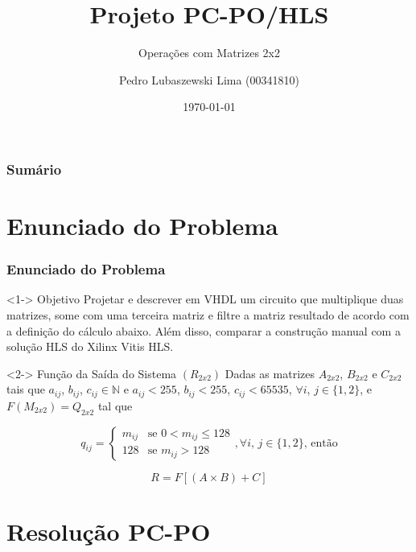 \documentclass{beamer}
\title[Projeto PC-PO/HLS]{Projeto PC-PO/HLS}
\subtitle{Operações com Matrizes 2x2}
\author[Pedro Lubaszewski Lima]{Pedro Lubaszewski Lima (00341810)}
\institute[]{INF01175\\Sistemas Digitais para Computadores A}
\date[\today]{\today}
\begin{document}
    \begin{frame}
        \maketitle
    \end{frame}

    \begin{frame}
        \frametitle{Sumário}
        \tableofcontents
    \end{frame}

    \section{Enunciado do Problema}
    \begin{frame}
        \frametitle{Enunciado do Problema}

        \begin{block}<1->
            {Objetivo}
            Projetar e descrever em VHDL um
            circuito que multiplique duas matrizes,
            some com uma terceira matriz e filtre a
            matriz resultado de acordo com a definição
            do cálculo abaixo. Além disso, comparar
            a construção manual com a solução HLS do
            Xilinx Vitis HLS.
        \end{block}

        \begin{block}<2->
            {Função da Saída do Sistema $ (R_{2x2}) $}
            Dadas as matrizes $ A_{2x2} $, $ B_{2x2} $
            e $ C_{2x2} $ tais que $ a_{ij} $, $ b_{ij} $,
            $ c_{ij} \in \mathbb{N} $ e $ a_{ij} < 255 $,
            $ b_{ij} < 255 $, $ c_{ij} < 65535 $, $ \forall i $,
            $ j \in \{ 1,2 \}$, e $ F(M_{2x2}) = Q_{2x2} $ tal que

            $$ q_{ij} = 
                \begin{cases}
                    m_{ij} & \text{se } 0 < m_{ij} \leqslant 128 \\
                    128 & \text{se } m_{ij} > 128
                \end{cases}
                \text{,} \,\forall i \text{, } j \in \{ 1,2 \} \text{, então}
            $$

            $$ R = F[(A \times B) + C] $$
        \end{block}
    \end{frame}

    \section{Resolução PC-PO}
\end{document}
